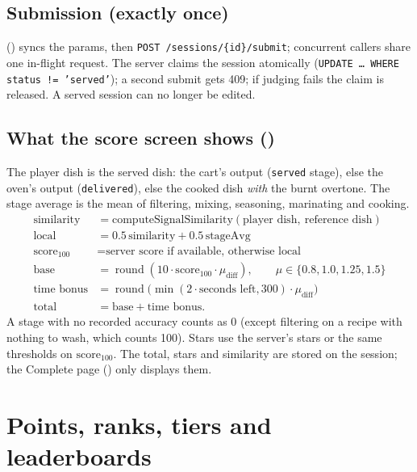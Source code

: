 \documentclass[11pt,a4paper]{article}
\begin{document}
\subsection{Submission (exactly once)}
 () syncs the params, then \texttt{POST
/sessions/\{id\}/submit}; concurrent callers share one in-flight request. The server claims the
session atomically (\texttt{UPDATE \dots\ WHERE status != 'served'}); a second submit gets 409; if
judging fails the claim is released. A served session can no longer be edited.

\subsection{What the score screen shows ()}
The player dish is the served dish: the cart's output (\texttt{served} stage), else the oven's
output (\texttt{delivered}), else the cooked dish \emph{with} the burnt overtone. The stage
average is the mean of filtering, mixing, seasoning, marinating and cooking.
\begin{align*}
\text{similarity}&=\text{computeSignalSimilarity}(\text{player dish},\ \text{reference dish})\\
\text{local}&=0.5\,\text{similarity}+0.5\,\text{stageAvg}\\
\text{score}_{100}&=\text{server score if available, otherwise local}\\
\text{base}&=\operatorname{round}(10\cdot\text{score}_{100}\cdot\mu_{\text{diff}}),\qquad
\mu\in\{0.8,1.0,1.25,1.5\}\\
\text{time bonus}&=\operatorname{round}\bigl(\min(2\cdot\text{seconds left},300)\cdot\mu_{\text{diff}}\bigr)\\
\text{total}&=\text{base}+\text{time bonus}.
\end{align*}
A stage with no recorded accuracy counts as 0 (except filtering on a recipe with nothing to
wash, which counts 100). Stars use the server's stars or the same thresholds on
$\text{score}_{100}$. The total, stars and similarity are stored on the session; the
Complete page () only displays them.

\section{Points, ranks, tiers and leaderboards}
\end{document}
